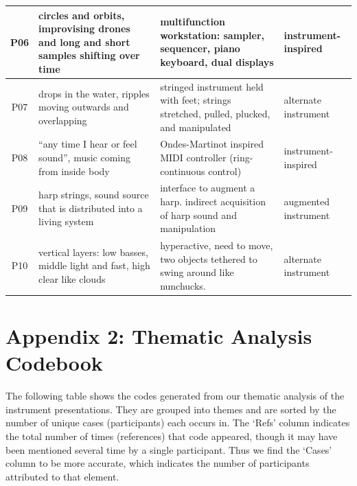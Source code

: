 \documentclass[letterpaper, 12pt]{article}
\begin{document}
\begin{spacing}{1.1}
\begin{longtable}{ c L{5.5cm} L{6.3cm} C{2.5cm} }
        P06 &
        circles and orbits, improvising drones and long and short samples shifting over time &
        multifunction workstation: sampler, sequencer, piano keyboard, dual displays &
        instrument-inspired \\ \hline
        
        P07 &
        drops in the water, ripples moving outwards and overlapping &
        stringed instrument held with feet; strings stretched, pulled, plucked, and manipulated &
        alternate instrument \\ \hline
        
        P08 &
        ``any time I hear or feel sound'', music coming from inside body &
        Ondes-Martinot inspired MIDI controller (ring-continuous control) &
        instrument-inspired \\ \hline
        
        P09 &
        harp strings, sound source that is distributed into a living system &
        interface to augment a harp. indirect acquisition of harp sound and manipulation &
        augmented instrument \\ \hline
        
        P10 &
        vertical layers: low basses, middle light and fast, high clear like clouds &
        hyperactive, need to move, two objects tethered to swing around like nunchucks. &
        alternate instrument \\ 
        \hline
    \end{longtable}
\end{spacing}

\section{Appendix 2: Thematic Analysis Codebook}

\noindent The following table shows the codes generated from our thematic analysis of the instrument presentations. They are grouped into themes and are sorted by the number of unique cases (participants) each occurs in. The `Refs' column indicates the total number of times (references) that code appeared, though it may have been mentioned several time by a single participant. Thus we find the `Cases' column to be more accurate, which indicates the number of participants attributed to that element. 
\end{document}
